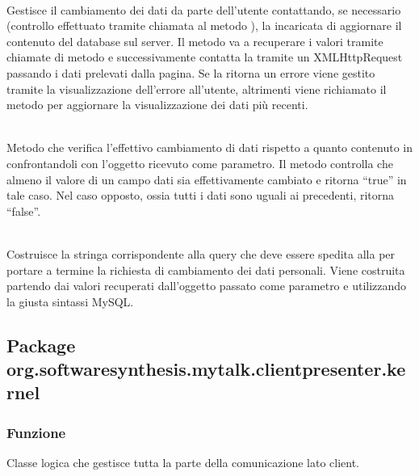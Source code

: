 \begin{description}
\item{}\\
Gestisce il cambiamento dei dati da parte dell'utente contattando, se necessario (controllo effettuato tramite chiamata al metodo ), la  incaricata di aggiornare il contenuto del database sul server. Il metodo va a recuperare i valori tramite chiamate di metodo  e successivamente contatta la  tramite un XMLHttpRequest passando i dati prelevati dalla pagina. Se la  ritorna un errore viene gestito tramite la visualizzazione dell'errore all'utente, altrimenti viene richiamato il metodo  per aggiornare la visualizzazione dei dati più recenti.

\item{}\\
Metodo che verifica l'effettivo cambiamento di dati rispetto a quanto contenuto in\\  confrontandoli con l'oggetto  ricevuto come parametro. Il metodo controlla che almeno il valore di un campo dati sia effettivamente cambiato e ritorna ``true'' in tale caso. Nel caso opposto, ossia tutti i dati sono uguali ai precedenti, ritorna ``false''.

\item{}\\
Costruisce la stringa corrispondente alla query che deve essere spedita alla  per portare a termine la richiesta di cambiamento dei dati personali. Viene costruita partendo dai valori recuperati dall'oggetto  passato come parametro e utilizzando la giusta sintassi MySQL.

\end{description}

\subsection{Package org.softwaresynthesis.mytalk.clientpresenter.kernel}\label{sec:kernel}

\subsubsection*{Funzione}
Classe logica che gestisce tutta la parte della comunicazione lato client.

